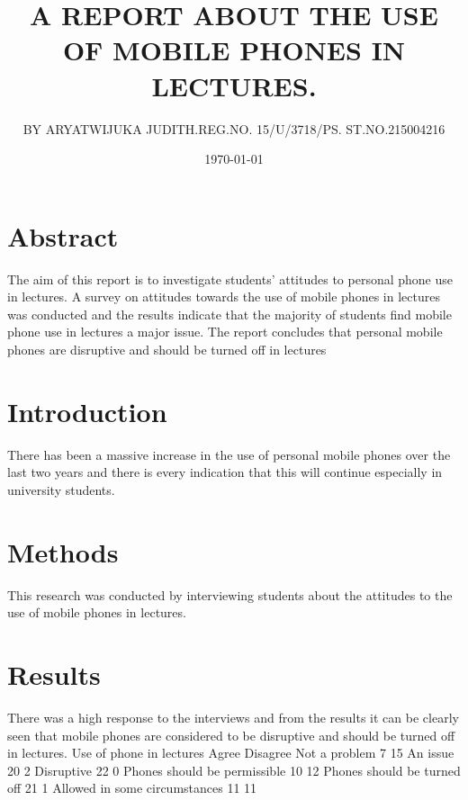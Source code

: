\documentclass[14pt]{article}
\begin{document}
\title{A REPORT ABOUT THE USE OF MOBILE PHONES IN LECTURES.}

\author{BY ARYATWIJUKA JUDITH.REG.NO. 15/U/3718/PS. ST.NO.215004216}

\date{\today}

\maketitle

\tableofcontents

\section{Abstract}

The aim of this report is to investigate students’ attitudes to personal phone use in lectures. A survey on attitudes towards the use of mobile phones in lectures was conducted and the results indicate that the majority of students find mobile phone use in lectures a major issue. The report concludes that personal mobile phones are disruptive and should be turned off in lectures

\section{Introduction}

There has been a massive increase in the use of personal mobile phones over the last two years and there is every indication that this will continue especially in university students.

\section{Methods}

This research was conducted by interviewing students about the attitudes to the use of mobile phones in lectures.

\section{Results}

There was a high response to the interviews and from the results it can be clearly seen that mobile phones are considered to be disruptive and should be turned off in lectures.
Use of phone in lectures	Agree 	Disagree 
Not a problem	              7	                       15
An issue	                   20                                 2            	
Disruptive 	                       22	                          0                   
Phones should be permissible	10	12
Phones should be turned off	21	1
Allowed in some circumstances	11	11
\end{document}
